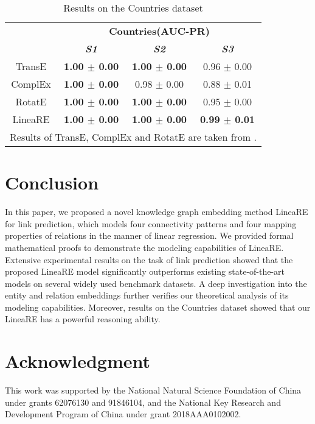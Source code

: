 \documentclass[conference]{IEEEtran}
\begin{document}
\begin{table}[t]
	\caption{Results on the Countries dataset}
	\begin{center}
		\begin{tabular}{|c|c|c|c|}
			\hline
			\textbf{}&\multicolumn{3}{|c|}{\textbf{Countries(AUC-PR)}} \\
			\cline{2-4} 
			\textbf{} & \textbf{\textit{S1}}& \textbf{\textit{S2}}& \textbf{\textit{S3}} \\
			\hline
			TransE
			& \textbf{1.00 $\pm$ 0.00}	& \textbf{1.00 $\pm$ 0.00}	& 0.96 $\pm$ 0.00  \\
			ComplEx
			& \textbf{1.00 $\pm$ 0.00}	& 0.98 $\pm$ 0.00	& 0.88 $\pm$ 0.01  \\
			RotatE
			& \textbf{1.00 $\pm$ 0.00}	& \textbf{1.00 $\pm$ 0.00}	& 0.95 $\pm$ 0.00  \\
			\hline
			LineaRE
			& \textbf{1.00 $\pm$ 0.00}	& \textbf{1.00 $\pm$ 0.00}	& \textbf{0.99 $\pm$ 0.01}  \\
			\hline
			\multicolumn{4}{l}{Results of TransE, ComplEx and RotatE are taken from \cite{RotatE}.}
		\end{tabular}
		\label{Countries}
	\end{center}
\end{table}

\section{Conclusion}
In this paper, we proposed a novel knowledge graph embedding method LineaRE for link prediction, which models four connectivity patterns and four mapping properties of relations  in the manner of linear regression. We provided formal mathematical proofs to demonstrate the modeling capabilities of LineaRE. Extensive experimental results on the task of link prediction showed that the proposed LineaRE model significantly outperforms existing state-of-the-art models on several widely used benchmark datasets. A deep investigation into the entity and relation embeddings further verifies our theoretical analysis of its modeling capabilities. Moreover, results on the Countries dataset showed that our LineaRE has a powerful reasoning ability.

\section*{Acknowledgment}
This work was supported by the National Natural Science Foundation of China under grants 62076130 and 91846104, and the National Key Research and Development Program of China under grant 2018AAA0102002.



\end{document}
